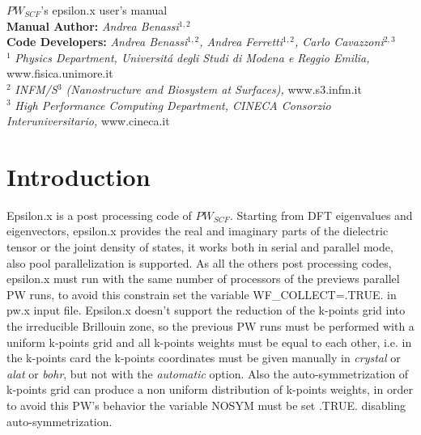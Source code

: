 \documentclass[twocolumn]{article}
\begin{document}
\begin{titlepage}
\Huge
\begin{center}
$PW_{SCF}$'s epsilon.x user's manual\\[4.5cm]
\normalsize
\vspace{10.5cm}
\textbf{Manual Author:}
\emph{Andrea Benassi}$^{1,2}$\\[0.3cm]
\textbf{Code Developers:}
\emph{Andrea Benassi$^{1,2}$, Andrea Ferretti$^{1,2}$, Carlo Cavazzoni$^{2,3}$}\\[1cm]
$^{1}$ \emph{Physics Department, Universit\'a degli Studi di Modena e Reggio Emilia,} www.fisica.unimore.it\\
$^{2}$ \emph{INFM/S$^{3}$ (Nanostructure and Biosystem at Surfaces),} www.s3.infm.it\\
$^{3}$ \emph{High Performance Computing Department, CINECA Consorzio Interuniversitario,} www.cineca.it\\
\end{center}
\end{titlepage}
\newpage
\section{Introduction}
Epsilon.x is a post processing code of $PW_{SCF}$. Starting from DFT eigenvalues and eigenvectors,
epsilon.x provides the real and imaginary parts of the dielectric tensor or the joint density of states, it works both in serial and
parallel mode, also pool parallelization is supported. As all the others post processing codes, epsilon.x must run with the same number of
processors of the previews parallel PW runs, to avoid this constrain set the variable WF\_COLLECT=.TRUE.
in pw.x input file.   
Epsilon.x doesn't support the reduction of the k-points grid into the irreducible Brillouin zone, so the previous PW runs must be
performed with a uniform k-points grid and all k-points weights must be equal to each other, i.e. in the k-points card the k-points
coordinates must be given manually in \emph{crystal} or \emph{alat} or \emph{bohr}, but not with the \emph{automatic} option. Also the
auto-symmetrization of k-points grid can produce a non uniform distribution of k-points weights, in order to avoid this
PW's behavior the variable NOSYM must be set .TRUE. disabling auto-symmetrization.
\end{document}
